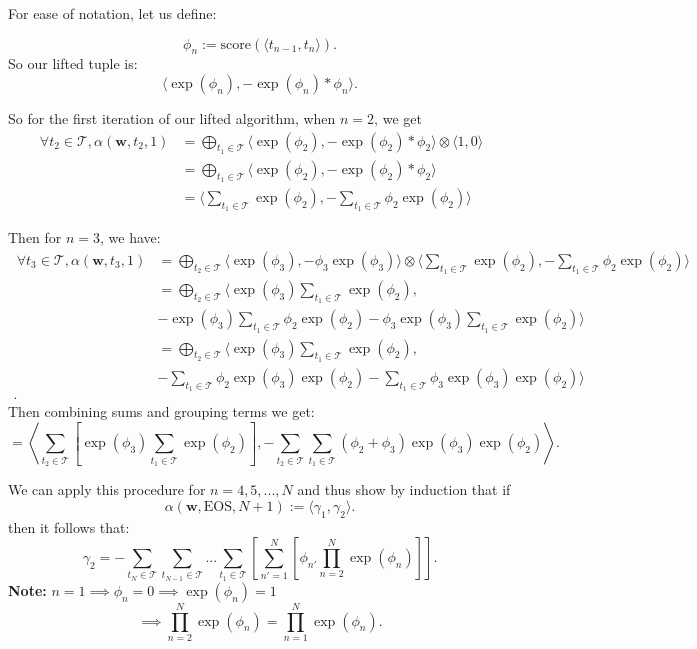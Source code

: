 \documentclass[a4paper]{article}
\begin{document}
For ease of notation, let us define:

\[
    \phi_n := \text{score}(\langle t_{n-1}, t_n \rangle)
.\]
So our lifted tuple is:
\[
\langle \exp(\phi_n), -\exp(\phi_n)*\phi_n  \rangle
.\]

So for the first iteration of our lifted algorithm, when $n=2$, we get
\begin{align*}
      ~\forall t_2 \in \mathcal{T}, \alpha(\bm{w}, t_2, 1) &=  \bigoplus_{t_1 \in \mathcal{T}} \langle \exp(\phi_2), -\exp(\phi_2)*\phi_2  \rangle \otimes \langle 1, 0 \rangle\\ 
 &=  \bigoplus_{t_1 \in \mathcal{T}} \langle \exp(\phi_2), -\exp(\phi_2)*\phi_2  \rangle \\ 
 &=  \langle \sum_{t_1 \in \mathcal{T}} \exp(\phi_2), -\sum_{t_1 \in \mathcal{T}} \phi_2\exp(\phi_2) \rangle
\end{align*}

Then for $n=3$, we have:
\begin{align*}
     ~\forall t_3 \in \mathcal{T}, \alpha(\bm{w}, t_3, 1) &=  \bigoplus_{t_2 \in \mathcal{T}} \langle \exp(\phi_3), -\phi_3 \exp(\phi_3) \rangle \otimes \langle \sum_{t_1 \in \mathcal{T}} \exp(\phi_2), - \sum_{t_1 \in \mathcal{T}} \phi_2 \exp(\phi_2) \rangle\\ 
 &=  \bigoplus_{t_2 \in \mathcal{T}} \langle \exp(\phi_3) \sum_{t_1 \in \mathcal{T}} \exp(\phi_2), \\
 &-\exp(\phi_3) \sum_{t_1 \in \mathcal{T}} \phi_2 \exp(\phi_2) - \phi_3 \exp(\phi_3) \sum_{t_1 \in \mathcal{T}} \exp(\phi_2) \rangle\\ 
 &=  \bigoplus_{t_2 \in \mathcal{T}} \langle \exp(\phi_3) \sum_{t_1 \in \mathcal{T}} \exp(\phi_2), \\
 &-\sum_{t_1 \in \mathcal{T}}  \phi_2 \exp(\phi_3)\exp(\phi_2) -\sum_{t_1 \in \mathcal{T}} \phi_3 \exp(\phi_3) \exp(\phi_2) \rangle\\ 
.
\end{align*}
Then combining sums and grouping terms we get:
\[
    = \left\langle \sum_{t_2 \in \mathcal{T}} \left[ \exp(\phi_3) \sum_{t_1 \in \mathcal{T}} \exp(\phi_2) \right], -\sum_{t_2 \in \mathcal{T}} \sum_{t_1 \in \mathcal{T}} (\phi_2 + \phi_3) \exp(\phi_3) \exp(\phi_2)  \right\rangle
.\]

We can apply this procedure for $n=4, 5, ..., N$
and thus show by induction that if 
\[
\alpha(\bm{w}, \text{EOS}, N+1) := \langle \gamma_1, \gamma_2 \rangle
.\]
then it follows that:
\[
    \gamma_2 = - \sum_{t_N \in \mathcal{T}} \sum_{t_{N-1} \in \mathcal{T}} ... \sum_{t_1 \in \mathcal{T}} \left[ \sum_{n' = 1}^{N} \left[ \phi_{n'} \prod_{n=2}^{N} \exp(\phi_n)  \right]  \right] 
.\]
\textbf{Note:} $n=1 \implies \phi_n = 0 \implies\exp(\phi_n) = 1$
\[
\implies \prod_{n=2}^{N} \exp(\phi_n) = \prod_{n=1}^{N} \exp(\phi_n)  
.\]
\end{document}
